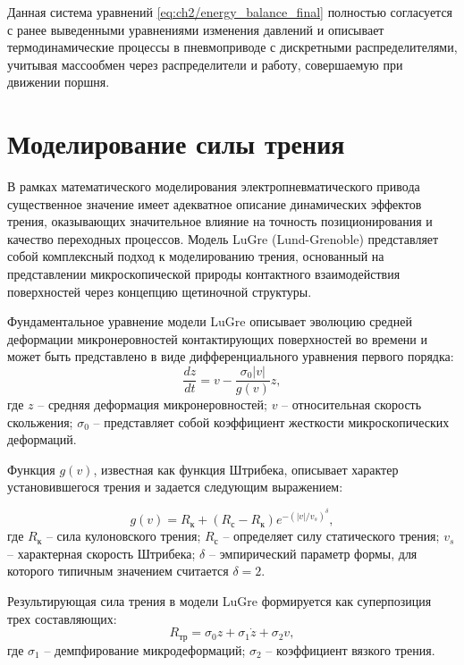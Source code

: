 Данная система уравнений \eqref{eq:ch2/energy_balance_final} полностью согласуется с ранее выведенными
уравнениями изменения давлений и описывает термодинамические процессы в пневмоприводе
с дискретными распределителями, учитывая массообмен через распределители и работу, совершаемую при движении поршня.

\section{Моделирование силы трения}\label{sec:ch2/sec2/subsec4}
В рамках математического моделирования электропневматического привода существенное значение имеет адекватное описание динамических эффектов трения,
оказывающих значительное влияние на точность позиционирования и качество переходных процессов.
Модель LuGre (Lund-Grenoble) представляет собой комплексный подход к моделированию трения,
основанный на представлении микроскопической природы контактного
взаимодействия поверхностей через концепцию щетиночной структуры.

Фундаментальное уравнение модели LuGre описывает эволюцию средней деформации
микронеровностей контактирующих поверхностей во времени и может быть представлено в виде дифференциального уравнения первого порядка:
\begin{equation}\label{eq:ch2/lugre}
\frac{dz}{dt} = v - \frac{\sigma_0|v|}{g(v)}z,
\end{equation}
где $z$ -- средняя деформация микронеровностей;
$v$ -- относительная скорость скольжения;
$\sigma_0$ -- представляет собой коэффициент жесткости микроскопических деформаций.

Функция $g(v)$, известная как функция Штрибека, описывает характер установившегося трения и задается следующим выражением:

\begin{equation}\label{eq:ch2/stiction_function}
g(v) = R_\text{к} + (R_\text{с} - R_\text{к})e^{-(|v|/v_s)^\delta},
\end{equation}
где $R_\text{к}$ -- сила кулоновского трения;
$R_\text{с}$ -- определяет силу статического трения;
$v_s$ -- характерная скорость Штрибека;
$\delta$ -- эмпирический параметр формы, для которого типичным значением считается $\delta = 2$.

Результирующая сила трения в модели LuGre формируется как суперпозиция трех составляющих:
\begin{equation}\label{eq:ch2/friction_force}
R_\text{тр} = \sigma_0z + \sigma_1\dot{z} + \sigma_2v,
\end{equation}
где $\sigma_1$ -- демпфирование микродеформаций;
$\sigma_2$ -- коэффициент вязкого трения.

